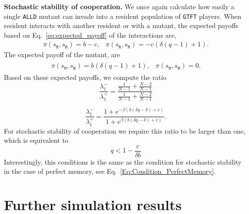 \documentclass[11pt]{article}
\def\alld{\texttt{ALLD}}
\def\gtft{\texttt{GTFT}}
\def\resident{\texttt{R}}
\def\mutant{\texttt{M}}
\def\strategy{s}
\theoremstyle{plainCl1}
\theoremstyle{plainCl2}
\begin{document}
\noindent
{\bf Stochastic stability of cooperation.}
We once again calculate how easily a single \alld{} mutant can invade into a
resident population of \gtft{} players. When resident interacts with another
resident or with a mutant,
the expected payoffs based on Eq.~\eqref{eq:expected_payoff} of the interactions are,
\begin{equation*}
\begin{array}{ll}
  \pi (\strategy_\resident, \strategy_\resident) =  b - c,
  &\pi (\strategy_\resident, \strategy_\mutant) =  - c \left(\delta \left(q - 1\right) + 1\right).
\end{array}
\end{equation*}
The expected payoff of the mutant, are
\begin{align*}
\begin{array}{ll}
  \pi (\strategy_\mutant, \strategy_\resident) =  b \left(\delta \left(q - 1\right) + 1\right),
  &\pi (\strategy_\mutant, \strategy_\mutant) =  0.
\end{array}
\end{align*}
Based on these expected payoffs, we compute the ratio
\begin{equation}
  \frac{\lambda^{-}_1}{\lambda^{+}_1} =
  \frac{\frac{1}{N-1} + \frac{N-2}{N-1}}{\frac{1}{N-1} + \frac{N-2}{N-1}}
\end{equation}


\begin{equation}
  \frac{\lambda^{-}_1}{\lambda^{+}_1} =
  \frac{1 + e^{- \beta \left(b \left(\delta q - \delta\right) + c\right)}}{1 + e^{\beta \left(b \left(\delta q - \delta\right) + c\right)}}.
\end{equation}
For stochastic stability of cooperation we require this ratio to be larger than one, which is equivalent to
\begin{equation} \label{Eq:Condition_OneInteractionExpectedPayoff}
  q<1 - \frac{c}{\delta b}
\end{equation}
Interestingly, this conditions is the same as the condition for stochastic
stability in the case of perfect memory, see
Eq.~\eqref{Eq:Condition_PerfectMemory}.

\clearpage




\section{Further simulation results}
\label{section:furthersimulations}
\end{document}
